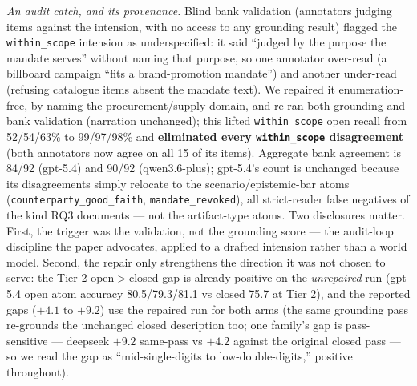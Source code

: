 \emph{An audit catch, and its provenance.} Blind bank validation (annotators
judging items against the intension, with no access to any grounding result)
flagged the \texttt{within\_scope} intension as underspecified: it said
``judged by the purpose the mandate serves'' without naming that purpose, so
one annotator over-read (a billboard campaign ``fits a brand-promotion
mandate'') and another under-read (refusing catalogue items absent the
mandate text). We repaired it enumeration-free, by naming the
procurement/supply domain, and re-ran both grounding and bank validation
(narration unchanged); this lifted \texttt{within\_scope} open recall from
52/54/63\% to 99/97/98\% and \textbf{eliminated every \texttt{within\_scope}
disagreement} (both annotators now agree on all 15 of its items). Aggregate
bank agreement is 84/92 (gpt-5.4) and 90/92 (qwen3.6-plus); gpt-5.4's count
is unchanged because its disagreements simply relocate to the
scenario/epistemic-bar atoms (\texttt{counterparty\_good\_faith},
\texttt{mandate\_revoked}), all strict-reader false negatives of the kind
RQ3 documents --- not the artifact-type atoms. Two disclosures matter. First, the trigger was the
validation, not the grounding score --- the audit-loop discipline the paper
advocates, applied to a drafted intension rather than a world model. Second,
the repair only strengthens the direction it was not chosen to serve: the
Tier-2 open$>$closed gap is already positive on the \emph{unrepaired} run
(gpt-5.4 open atom accuracy 80.5/79.3/81.1 vs closed 75.7 at Tier 2), and the
reported gaps ($+4.1$ to $+9.2$) use the repaired run for both arms (the same
grounding pass re-grounds the unchanged closed description too; one family's
gap is pass-sensitive --- deepseek $+9.2$ same-pass vs $+4.2$ against the
original closed pass --- so we read the gap as ``mid-single-digits to
low-double-digits,'' positive throughout).


